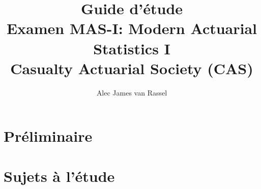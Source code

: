 \documentclass[12pt, titlepage, french]{report}
\title{
	Guide d'étude	\\
	\large Examen MAS-I: Modern Actuarial Statistics I\\
	Casualty Actuarial Society (CAS)}
\date{}
\author{Alec James van Rassel}
\begin{document}
\maketitle

\tableofcontents

\clearpage

\part*{Préliminaire}



\newpage


\part*{Sujets à l'étude}



\newpage



\newpage



\newpage



\newpage
\end{document}
